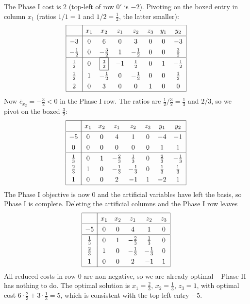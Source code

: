 \documentclass[a4paper]{scrartcl}
\begin{document}
\begin{example}
$$    $$
    The Phase I cost is $2$ (top-left of row $0'$ is $-2$). Pivoting on the boxed entry in column $x_1$ (ratios $1/1 = 1$ and $1/2 = \frac12$, the latter smaller):
    $$
    \arraycolsep=5pt\def\arraystretch{1.3}
    \begin{array}{|c|ccccccc|}\hline
        \multicolumn{1}{|c|}{} & x_1 & x_2 & z_1 & z_2 & z_3 & y_1 & y_2\\\hline
        -3 & 0 & 6 & 0 & 3 & 0 & 0 & -3\\
        -\frac12 & 0 & -\frac32 & 1 & -\frac12 & 0 & 0 & \frac32\\\hline
        \frac12 & 0 & \boxed{\tfrac32} & -1 & \frac12 & 0 & 1 & -\frac12\\
        \frac12 & 1 & -\frac12 & 0 & -\frac12 & 0 & 0 & \frac12\\
        2 & 0 & 3 & 0 & 0 & 1 & 0 & 0\\\hline
    \end{array}
    $$
    Now $\bar c_{x_2} = -\frac32 < 0$ in the Phase I row. The ratios are $\frac12 / \frac32 = \frac13$ and $2/3$, so we pivot on the boxed $\frac32$:
    $$
    \arraycolsep=5pt\def\arraystretch{1.3}
    \begin{array}{|c|ccccccc|}\hline
        \multicolumn{1}{|c|}{} & x_1 & x_2 & z_1 & z_2 & z_3 & y_1 & y_2\\\hline
        -5 & 0 & 0 & 4 & 1 & 0 & -4 & -1\\
        0 & 0 & 0 & 0 & 0 & 0 & 1 & 1\\\hline
        \frac13 & 0 & 1 & -\frac23 & \frac13 & 0 & \frac23 & -\frac13\\
        \frac23 & 1 & 0 & -\frac13 & -\frac13 & 0 & \frac13 & \frac13\\
        1 & 0 & 0 & 2 & -1 & 1 & -2 & 1\\\hline
    \end{array}
    $$
    The Phase I objective is now $0$ and the artificial variables have left the basis, so Phase I is complete. Deleting the artificial columns and the Phase I row leaves
    $$
    \arraycolsep=5pt\def\arraystretch{1.3}
    \begin{array}{|c|ccccc|}\hline
        \multicolumn{1}{|c|}{} & x_1 & x_2 & z_1 & z_2 & z_3\\\hline
        -5 & 0 & 0 & 4 & 1 & 0\\\hline
        \frac13 & 0 & 1 & -\frac23 & \frac13 & 0\\
        \frac23 & 1 & 0 & -\frac13 & -\frac13 & 0\\
        1 & 0 & 0 & 2 & -1 & 1\\\hline
    \end{array}
    $$
    All reduced costs in row $0$ are non-negative, so we are already optimal -- Phase II has nothing to do. The optimal solution is $x_1 = \frac23$, $x_2 = \frac13$, $z_3 = 1$, with optimal cost $6\cdot\frac23 + 3\cdot\frac13 = 5$, which is consistent with the top-left entry $-5$.
\end{example}
\end{document}
